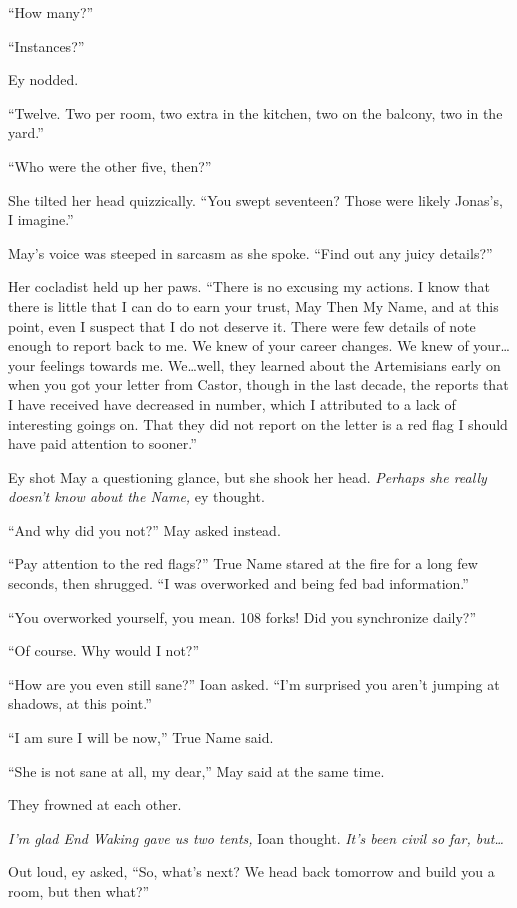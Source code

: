 ``How many?''

``Instances?''

Ey nodded.

``Twelve. Two per room, two extra in the kitchen, two on the balcony, two in the yard.''

``Who were the other five, then?''

She tilted her head quizzically. ``You swept seventeen? Those were likely Jonas's, I imagine.''

May's voice was steeped in sarcasm as she spoke. ``Find out any juicy details?''

Her cocladist held up her paws. ``There is no excusing my actions. I know that there is little that I can do to earn your trust, May Then My Name, and at this point, even I suspect that I do not deserve it. There were few details of note enough to report back to me. We knew of your career changes. We knew of your\ldots your feelings towards me. We\ldots well, they learned about the Artemisians early on when you got your letter from Castor, though in the last decade, the reports that I have received have decreased in number, which I attributed to a lack of interesting goings on. That they did not report on the letter is a red flag I should have paid attention to sooner.''

Ey shot May a questioning glance, but she shook her head. \emph{Perhaps she really doesn't know about the Name,} ey thought.

``And why did you not?'' May asked instead.

``Pay attention to the red flags?'' True Name stared at the fire for a long few seconds, then shrugged. ``I was overworked and being fed bad information.''

``You overworked yourself, you mean. 108 forks! Did you synchronize daily?''

``Of course. Why would I not?''

``How are you even still sane?'' Ioan asked. ``I'm surprised you aren't jumping at shadows, at this point.''

``I am sure I will be now,'' True Name said.

``She is not sane at all, my dear,'' May said at the same time.

They frowned at each other.

\emph{I'm glad End Waking gave us two tents,} Ioan thought. \emph{It's been civil so far, but\ldots{}}

Out loud, ey asked, ``So, what's next? We head back tomorrow and build you a room, but then what?''

